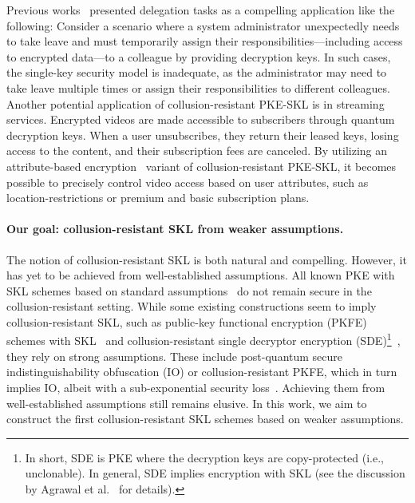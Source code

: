Previous works~\cite{TCC:AnaPorVai23,TCC:AnaHuHua24} presented delegation tasks as a compelling application like the following:
Consider a scenario where a system administrator unexpectedly needs to take leave and must temporarily assign their responsibilities---including access to encrypted data---to a colleague by providing decryption keys.
In such cases, the single-key security model is inadequate, as the administrator may need to take leave multiple times or assign their responsibilities to different colleagues.
Another potential application of collusion-resistant PKE-SKL is in streaming services.
Encrypted videos are made accessible to subscribers through quantum decryption keys.
When a user unsubscribes, they return their leased keys, losing access to the content, and their subscription fees are canceled. By utilizing an attribute-based encryption~\cite{EC:SahWat05} variant of collusion-resistant PKE-SKL, it becomes possible to precisely control video access based on user attributes, such as location-restrictions or premium and basic subscription plans.

\paragraph{Our goal: collusion-resistant SKL from weaker assumptions.}
The notion of collusion-resistant SKL is both natural and compelling. However, it has yet to be achieved from well-established assumptions.  
All known PKE with SKL schemes based on standard assumptions~\cite{EC:AKNYY23,TCC:AnaPorVai23,EPRINT:CGJL23,TCC:AnaHuHua24,myEPRINT:KitMorYam24} do not remain secure in the collusion-resistant setting.  
While some existing constructions seem to imply collusion-resistant SKL, such as public-key functional encryption (PKFE) schemes with SKL~\cite{EC:AKNYY23,EC:BGKMRR24} and collusion-resistant single decryptor encryption (SDE)\footnote{In short, SDE is PKE where the decryption keys are copy-protected (i.e., unclonable). In general, SDE implies encryption with SKL (see the discussion by Agrawal et al.~\cite{EC:AKNYY23} for details).}~\cite{TCC:CakGoy24}, they rely on strong assumptions. These include post-quantum secure indistinguishability obfuscation (IO) or collusion-resistant PKFE, which in turn implies IO, albeit with a sub-exponential security loss~\cite{JACM:BitVai18,C:AnaJai15,EPRINT:AnaJaiSah15a}. Achieving them from well-established assumptions still remains elusive.
In this work, we aim to construct the first collusion-resistant SKL schemes based on weaker assumptions.

